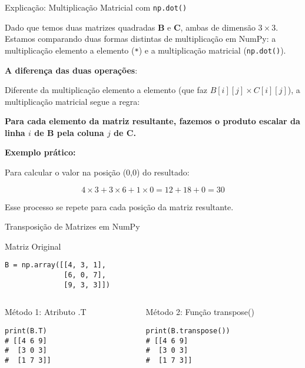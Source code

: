 \begin{frame}{Explicação: Multiplicação Matricial com \texttt{np.dot()}}

    Dado que temos duas matrizes quadradas \textbf{B} e \textbf{C}, ambas de dimensão $3 \times 3$.
    Estamos comparando duas formas distintas de multiplicação em NumPy: a multiplicação elemento a elemento (\texttt{*}) e a multiplicação matricial (\texttt{np.dot()}).

    \bigskip

    \textbf{A diferença das duas operações}:

    Diferente da multiplicação elemento a elemento (que faz $B[i][j] \times C[i][j]$), a multiplicação matricial segue a regra:

    \textbf{Para cada elemento da matriz resultante, fazemos o produto escalar da linha $i$ de \textbf{B} pela coluna $j$ de \textbf{C}.}

    \bigskip

    \textbf{Exemplo prático:}

    Para calcular o valor na posição (0,0) do resultado:

    \[
        4 \times 3 + 3 \times 6 + 1 \times 0 = 12 + 18 + 0 = 30
    \]

    Esse processo se repete para cada posição da matriz resultante.

    \bigskip



\end{frame}


\begin{frame}[fragile]{Transposição de Matrizes em NumPy}

    \begin{block}{Matriz Original}
        \begin{verbatim}
B = np.array([[4, 3, 1],
              [6, 0, 7],
              [9, 3, 3]])
\end{verbatim}
    \end{block}

    \begin{columns}[T]
        \begin{column}{0.5\textwidth}
            \begin{exampleblock}{Método 1: Atributo .T}
                \begin{verbatim}
print(B.T)
# [[4 6 9]
#  [3 0 3]
#  [1 7 3]]
\end{verbatim}
            \end{exampleblock}
        \end{column}

        \begin{column}{0.5\textwidth}
            \begin{exampleblock}{Método 2: Função transpose()}
                \begin{verbatim}
print(B.transpose())
# [[4 6 9]
#  [3 0 3]
#  [1 7 3]]
\end{verbatim}
            \end{exampleblock}
        \end{column}
    \end{columns}


\end{frame}

